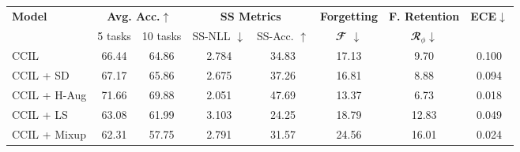 \documentclass[final]{cvpr}
\newcommand{\ilkd}{CCIL }
\newcommand{\cfr}{$\mathbfcal{R}_{\phi}$} \newcommand\todo[1]{(\textcolor{red}{TODO: #1})}
\begin{document}
\begin{table*}[t]
    \begin{center}
\begin{tabular}{| @{\hskip10pt}l@{\hskip10pt}|@{\hskip10pt}c@{\hskip10pt}|@{\hskip10pt}c@{\hskip10pt}|c|c |c|c | c|}
   
    \hline
    
    \multirow{2}{*}{\textbf{Model}} &  \multicolumn{2}{c|}{\textbf{ Avg. Acc.}$\uparrow$} & \multicolumn{2}{c|}{\textbf{SS Metrics}}  &  \textbf{Forgetting} & \textbf{F. Retention} & \multirow{2}{*}{\textbf{ECE}$\downarrow$} \\
    
& 5 tasks  & 10 tasks  & SS-NLL $\downarrow$ & SS-Acc. $\uparrow$  & $\mathbfcal{F}$ $\downarrow$  & \cfr $\downarrow$ & \\
  \hline
    \ilkd                            & 66.44    & 64.86  & 2.784    & 34.83  & 17.13 & 9.70 & 0.100\\
    \ilkd + SD                       & \textcolor{dgreen}{67.17}             & \textcolor{dgreen}{65.86}     & \textcolor{dgreen}{2.675}     & \textcolor{dgreen}{37.26}  & \textcolor{dgreen}{16.81} &  \textcolor{dgreen}{8.88} & \textcolor{dgreen}{0.094}\\
    
    \ilkd +  H-Aug                   & \textcolor{dgreen}{71.66}             & \textcolor{dgreen}{69.88}     & \textcolor{dgreen}{2.051}     & \textcolor{dgreen}{47.69} & \textcolor{dgreen}{13.37} & \textcolor{dgreen}{6.73} & \textcolor{dgreen}{0.018}\\
    
    \ilkd + LS                       & \textcolor{dred}{63.08}               & \textcolor{dred}{61.99}       & \textcolor{dred}{3.103}       & \textcolor{dred}{24.25} & \textcolor{dred}{18.79} & \textcolor{dred}{12.83} & \textcolor{dgreen}{0.049}  \\
    
    \ilkd + Mixup                    & \textcolor{dred}{62.31}               & \textcolor{dred}{57.75}       & \textcolor{dred}{2.791}       & \textcolor{dred}{31.57} &  \textcolor{dred}{24.56} &  \textcolor{dred}{16.01} & \textcolor{dgreen}{0.024} \\


    \hline
    \end{tabular}
    \end{center}
    \caption{Effect of regularization class-IL average accuracy, secondary information (on the first-task model), forgetting rate and feature retention (5 tasks), on CIFAR-100. All the values are averaged over 3 runs. $\downarrow$ and $\uparrow$ in the column headings indicate that lower and higher values are better respectively.
Values that are better than the \ilkd baseline are marked in green whereas the worse ones are marked in red. SD:self-distillation, LS:label-smoothing, H-Aug:heavy data augmentation. Standard deviation in Appendix A.}
    \label{table:reg}
\end{table*}
\end{document}
